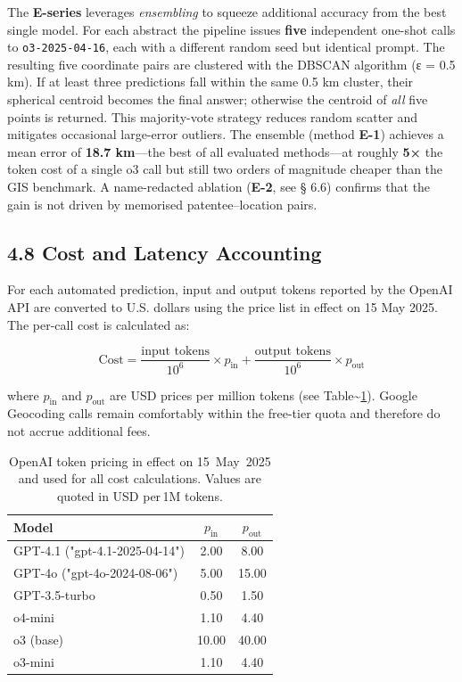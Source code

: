 The \textbf{E-series} leverages \emph{ensembling} to squeeze additional
accuracy from the best single model. For each abstract the pipeline
issues \textbf{five} independent one-shot calls to
\passthrough{\lstinline!o3-2025-04-16!}, each with a different random
seed but identical prompt. The resulting five coordinate pairs are
clustered with the DBSCAN algorithm (ε = 0.5 km). If at least three
predictions fall within the same 0.5 km cluster, their spherical
centroid becomes the final answer; otherwise the centroid of \emph{all}
five points is returned. This majority-vote strategy reduces random
scatter and mitigates occasional large-error outliers. The ensemble
(method \textbf{E-1}) achieves a mean error of \textbf{18.7 km}---the
best of all evaluated methods---at roughly \textbf{5×} the token cost of
a single o3 call but still two orders of magnitude cheaper than the GIS
benchmark. A name-redacted ablation (\textbf{E-2}, see § 6.6) confirms
that the gain is not driven by memorised patentee--location pairs.

\subsection{4.8 Cost and Latency
Accounting}\label{cost-and-latency-accounting}

For each automated prediction, input and output tokens reported by the
OpenAI API are converted to U.S. dollars using the price list in effect
on 15 May 2025. The per-call cost is calculated as:

\[
\text{Cost} = \frac{\text{input tokens}}{10^{6}} \times p_{\text{in}} + \frac{\text{output tokens}}{10^{6}} \times p_{\text{out}}
\]

where \(p_{\text{in}}\) and \(p_{\text{out}}\) are USD prices per
million tokens (see Table\textasciitilde{}\ref{tbl:prices}). Google
Geocoding calls remain comfortably within the free-tier quota and
therefore do not accrue additional fees.

\begin{table}[H]
\centering
\caption{OpenAI token pricing in effect on 15~May~2025 and used for all cost calculations.  Values are quoted in USD per\,1M tokens.}
\label{tbl:prices}
\begin{tabular}{lcc}
\toprule
Model & $p_{\text{in}}$ & $p_{\text{out}}$ \\
\midrule
GPT-4.1 ("gpt-4.1-2025-04-14") & 2.00 & 8.00 \\
GPT-4o ("gpt-4o-2024-08-06") & 5.00 & 15.00 \\
GPT-3.5-turbo & 0.50 & 1.50 \\
o4-mini & 1.10 & 4.40 \\
o3 (base) & 10.00 & 40.00 \\
o3-mini & 1.10 & 4.40 \\
\bottomrule
\end{tabular}
\end{table}

